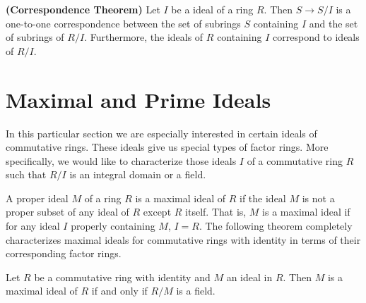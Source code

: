  
\begin{theorem} {\bf (Correspondence Theorem)}
Let $I$ be a ideal of a ring $R$. Then $S \rightarrow S/I$ is a
one-to-one correspondence between the set of subrings $S$ containing
$I$  and the set of subrings of $R/I$. Furthermore, the ideals
of $R$ containing $I$ correspond to ideals of $R/I$. 
\end{theorem}
 
 
 
 
 
\section{Maximal and Prime Ideals}
 
 
In this particular section we are especially interested in certain
ideals of commutative rings. These ideals give us special types of factor
rings. More specifically, we would like to characterize those ideals
$I$ of a commutative ring $R$ such that $R/I$ is an integral domain or
a field.  
 
 
A proper ideal $M$ of a ring $R$ is a {\bfi maximal
ideal\/} of $R$ if the ideal
$M$ is not a proper subset of any ideal of $R$ except $R$ itself.
That is, $M$ is a 
maximal ideal if for any ideal $I$ properly containing $M$, $I = R$.
The following theorem completely characterizes maximal ideals for
commutative rings with identity in terms of their corresponding factor
rings.  
 
 
\begin{theorem}
Let $R$ be a commutative ring with identity and $M$ an ideal in $R$.
Then $M$ is a maximal ideal of $R$ if and only if $R/M$ is a field. 
\end{theorem}
 
